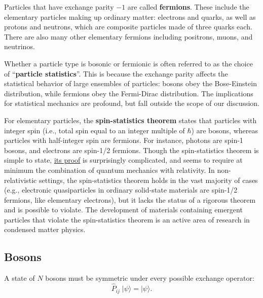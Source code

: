 \documentclass[prx,12pt]{revtex4-2}
\begin{document}
Particles that have exchange parity $-1$ are called \textbf{fermions}.
These include the elementary particles making up ordinary matter:
electrons and quarks, as well as protons and neutrons, which are
composite particles made of three quarks each.  There are also many
other elementary fermions including positrons, muons, and neutrinos.

Whether a particle type is bosonic or fermionic is often referred to
as the choice of ``\textbf{particle statistics}''.  This is because
the exchange parity affects the statistical behavior of large
ensembles of particles: bosons obey the Bose-Einstein distribution,
while fermions obey the Fermi-Dirac distribution.  The implications
for statistical mechanics are profound, but fall outside the scope of
our discussion.

For elementary particles, the \textbf{spin-statistics theorem} states
that particles with integer spin (i.e., total spin equal to an integer
multiple of $\hbar$) are bosons, whereas particles with half-integer
spin are fermions.  For instance, photons are spin-1 bosons, and
electrons are spin-1/2 fermions.  Though the spin-statistics theorem
is simple to state, \hyperref[cite:duck]{its proof} is surprisingly
complicated, and seems to require at minimum the combination of
quantum mechanics with relativity.  In non-relativistic settings, the
spin-statistics theorem holds in the vast majority of cases (e.g.,
electronic quasiparticles in ordinary solid-state materials are
spin-1/2 fermions, like elementary electrons), but it lacks the status
of a rigorous theorem and is possible to violate.  The development of
materials containing emergent particles that violate the
spin-statistics theorem is an active area of research in condensed
matter physics.

\subsection{Bosons}
\label{sec:bosons}

A state of $N$ bosons must be symmetric under every possible exchange
operator:
\begin{equation}
  \hat{P}_{ij}\; |\psi\rangle = |\psi\rangle.
  \label{sym}
\end{equation}
\end{document}

